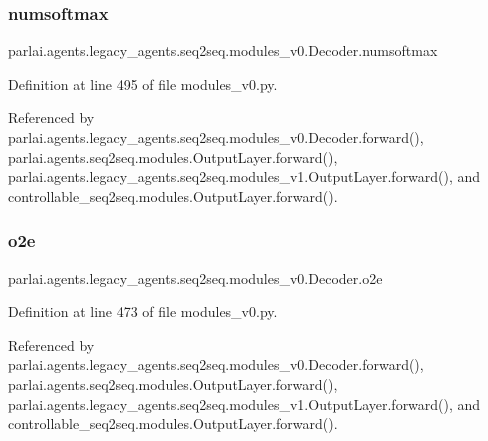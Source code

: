 \subsubsection{\texorpdfstring{numsoftmax}{numsoftmax}}
{\footnotesize\ttfamily parlai.\+agents.\+legacy\+\_\+agents.\+seq2seq.\+modules\+\_\+v0.\+Decoder.\+numsoftmax}



Definition at line 495 of file modules\+\_\+v0.\+py.



Referenced by parlai.\+agents.\+legacy\+\_\+agents.\+seq2seq.\+modules\+\_\+v0.\+Decoder.\+forward(), parlai.\+agents.\+seq2seq.\+modules.\+Output\+Layer.\+forward(), parlai.\+agents.\+legacy\+\_\+agents.\+seq2seq.\+modules\+\_\+v1.\+Output\+Layer.\+forward(), and controllable\+\_\+seq2seq.\+modules.\+Output\+Layer.\+forward().

\mbox{\label{classparlai_1_1agents_1_1legacy__agents_1_1seq2seq_1_1modules__v0_1_1Decoder_a6588ae76a3e9c1978784dd1eaa23557e}} 
\subsubsection{\texorpdfstring{o2e}{o2e}}
{\footnotesize\ttfamily parlai.\+agents.\+legacy\+\_\+agents.\+seq2seq.\+modules\+\_\+v0.\+Decoder.\+o2e}



Definition at line 473 of file modules\+\_\+v0.\+py.



Referenced by parlai.\+agents.\+legacy\+\_\+agents.\+seq2seq.\+modules\+\_\+v0.\+Decoder.\+forward(), parlai.\+agents.\+seq2seq.\+modules.\+Output\+Layer.\+forward(), parlai.\+agents.\+legacy\+\_\+agents.\+seq2seq.\+modules\+\_\+v1.\+Output\+Layer.\+forward(), and controllable\+\_\+seq2seq.\+modules.\+Output\+Layer.\+forward().

\mbox{\label{classparlai_1_1agents_1_1legacy__agents_1_1seq2seq_1_1modules__v0_1_1Decoder_af30d7566b86f8a69684bc03aead1fb84}} 
